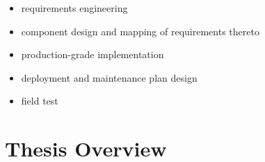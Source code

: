 \begin{itemize}
  \item requirements engineering
  \item component design and mapping of requirements thereto
  \item production-grade implementation
  \item deployment and maintenance plan design
  \item field test
\end{itemize}

\section{Thesis Overview}
\label{sec:thesis-overview}
